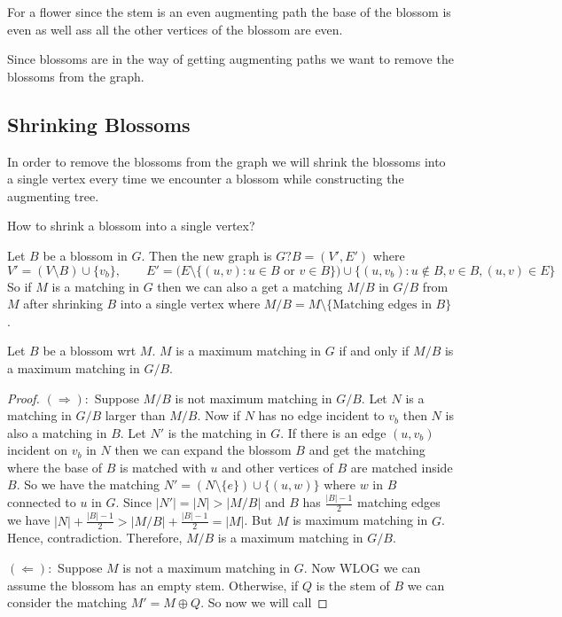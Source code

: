 \begin{observation}
	For a flower since the stem is an even augmenting path the base of the blossom is even as well ass all the other vertices of the blossom are even.
\end{observation}

Since blossoms are in the way of getting augmenting paths we want to remove the blossoms from the graph.
\subsection{Shrinking Blossoms}
In order to remove the blossoms from the graph we will shrink the blossoms into a single vertex every time we encounter a blossom while constructing the augmenting tree.
\begin{question}{}{}
	How to shrink a blossom into a single vertex?
\end{question}

Let $B$ be a blossom in $G$. Then the new graph is $G?B=(V',E')$ where $$V'=(V\setminus B)\cup \{v_b\},\qquad E'=\Big(E\setminus\{(u,v)\colon u\in B\text{ or }v\in B\}\Big)\cup \{(u,v_b)\colon u\notin B, v\in B, (u,v)\in E\}$$ So if $M$ is a matching in $G$ then we can also a get a matching $M/B$  in $G/B$ from $M$ after shrinking $B$ into  a single vertex where $M/B=M\setminus \{\text{Matching edges in $B$}\}$.
\begin{Theorem}{}{}
	Let $B$ be a blossom wrt $M$. $M$ is a maximum matching in $G$ if and only if $M/B$ is a maximum matching in $G/B$.
\end{Theorem}
\begin{proof}
$(\Longrightarrow):$ Suppose $M/B$ is not maximum matching in $G/B$. Let $N$ is a matching in $G/B$ larger than $M/B$. Now if $N$ has no edge incident to $v_b$ then $N$ is also a matching in $B$. Let $N'$ is the matching in $G$. If there is an edge $(u,v_b)$ incident on $v_b$ in $N$ then we can expand the blossom $B$ and get the matching where the base of $B$ is matched with $u$ and other vertices of $B$ are matched inside $B$. So we have the matching $N'=(N\setminus\{e\})\cup \{(u,w)\}$ where $w$ in $B$ connected to $u$ in $G$. Since $|N'|=|N|>|M/B|$ and $B$ has $\frac{|B|-1}2$ matching edges we have $|N|+\frac{|B|-1}2>|M/B|+\frac{|B|-1}2=|M|$. But $M$ is maximum matching in $G$. Hence, contradiction. Therefore, $M/B$ is a maximum matching in $G/B$.

$(\Longleftarrow):$ Suppose $M$ is not a maximum matching in $G$. Now WLOG we can assume the blossom has an empty stem. Otherwise, if $Q$ is the stem of $B$ we can consider the matching $M'=M\oplus Q$. So now we will call
\end{proof}
